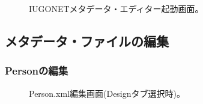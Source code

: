 \begin{figure}[H]
\begin{center}
\caption{IUGONETメタデータ・エディター起動画面。}
\label{IugonetMetadataEditor1}
\end{center}
\end{figure}

\subsection{メタデータ・ファイルの編集}

\subsubsection{Personの編集}

\begin{figure}[H]
\begin{center}
\caption{Person.xml編集画面(Designタブ選択時)。}
\label{IugonetMetadataEditor2}
\end{center}
\end{figure}

